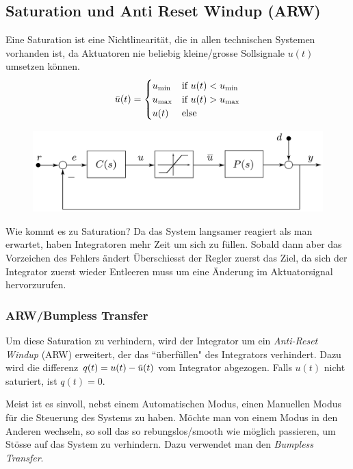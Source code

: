\subsection{Saturation und Anti Reset Windup (ARW)}
    Eine Saturation ist eine Nichtlinearität, die in allen technischen Systemen vorhanden ist, da Aktuatoren nie beliebig kleine/grosse Sollsignale $u(t)$ umsetzen können.
    \begin{equation*}
        \Bar{u}(t) = 
        \begin{cases}
        u_\textnormal{min}   &\textnormal{if } u(t) < u_{\textnormal{min}}\\
        u_\textnormal{max}   &\textnormal{if } u(t) > u_{\textnormal{max}}\\
        u(t)    &\textnormal{else}
        \end{cases}
    \end{equation*}
    \begin{figure}[H]
        \centering
        \includegraphics[width = 0.6\linewidth]{images/04/arw.jpeg}
    \end{figure}
    
    Wie kommt es zu Saturation? Da das System langsamer reagiert als man erwartet, haben Integratoren mehr Zeit um sich zu füllen. Sobald dann aber das Vorzeichen des Fehlers ändert Überschiesst der Regler zuerst das Ziel, da sich der Integrator zuerst wieder Entleeren muss um eine Änderung im Aktuatorsignal hervorzurufen. 
    
    \subsubsection{ARW/Bumpless Transfer}
        Um diese Saturation zu verhindern, wird der Integrator um ein \textit{Anti-Reset Windup} (ARW) erweitert, der das ``überfüllen" des Integrators verhindert. Dazu wird die differenz $q(t) = u(t) - \Bar{u}(t)$ vom Integrator abgezogen. Falls $u(t)$ nicht saturiert, ist $q(t)= 0$.
        
        Meist ist es sinvoll, nebst einem Automatischen Modus, einen Manuellen Modus für die Steuerung des Systems zu haben. Möchte man von einem Modus in den Anderen wechseln, so soll das so rebungslos/smooth wie möglich passieren, um Stösse auf das System zu verhindern. Dazu verwendet man den \textit{Bumpless Transfer}.
        
